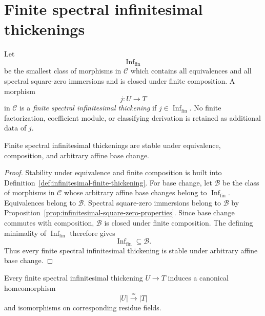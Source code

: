 \section{Finite spectral infinitesimal thickenings}
\label{sec:infinitesimal-finite-thickenings}

\begin{definition}
\label{def:infinitesimal-finite-thickening}
Let
\[
    \operatorname{Inf}_{\mathrm{fin}}
\]
be the smallest class of morphisms in \(\mathcal C\) which contains all
equivalences and all spectral square-zero immersions and is closed under
finite composition.  A morphism
\[
    j:U\longrightarrow T
\]
in $\mathcal C$ is a \emph{finite spectral infinitesimal thickening} if
\(j\in\operatorname{Inf}_{\mathrm{fin}}\).  No finite factorization,
coefficient module, or classifying derivation is retained as additional data
of \(j\).
\end{definition}

\begin{proposition}[Permanence]
\label{prop:infinitesimal-thickening-permanence}
Finite spectral infinitesimal thickenings are stable under equivalence,
composition, and arbitrary affine base change.
\end{proposition}

\begin{proof}
Stability under equivalence and finite composition is built into
Definition~\ref{def:infinitesimal-finite-thickening}.  For base change, let
\(\mathcal B\) be the class of morphisms in \(\mathcal C\) whose arbitrary
affine base changes belong to \(\operatorname{Inf}_{\mathrm{fin}}\).
Equivalences belong to \(\mathcal B\).  Spectral square-zero immersions belong
to \(\mathcal B\) by
Proposition~\ref{prop:infinitesimal-square-zero-properties}.  Since base
change commutes with composition, \(\mathcal B\) is closed under finite
composition.  The defining minimality of
\(\operatorname{Inf}_{\mathrm{fin}}\) therefore gives
\[
    \operatorname{Inf}_{\mathrm{fin}}\subseteq\mathcal B.
\]
Thus every finite spectral infinitesimal thickening is stable under arbitrary
affine base change.
\end{proof}

\begin{lemma}
\label{lem:infinitesimal-support-invariance}
Every finite spectral infinitesimal thickening $U\to T$ induces a canonical
homeomorphism
\[
    |U|\xrightarrow{\simeq}|T|
\]
and isomorphisms on corresponding residue fields.
\end{lemma}

